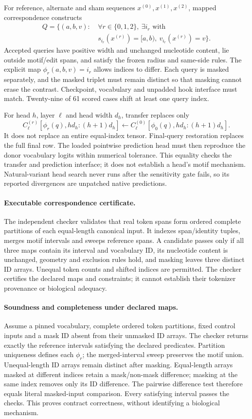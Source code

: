 \documentclass[unnumsec,webpdf,modern,large,namedate]{oup-authoring-template}
\begin{document}
For reference, alternate and sham sequences $x^{(0)},x^{(1)},x^{(2)}$, mapped correspondence constructs
\[
\begin{aligned}Q=\{(a,b,v):\ &\forall r\in\{0,1,2\},\ \exists i_r\text{ with }\\
&s_{i_r}(x^{(r)})=[a,b),\ v_{i_r}(x^{(r)})=v\}.\end{aligned}
\]
Accepted queries have positive width and unchanged nucleotide content, lie outside motif/edit spans, and satisfy the frozen radius and same-side rules. The explicit map $\phi_r(a,b,v)=i_r$ allows indices to differ. Each query is masked separately, and the masked triplet must remain distinct so that masking cannot erase the contrast. Checkpoint, vocabulary and unpadded hook interface must match. Twenty-nine of 61 scored cases shift at least one query index.

For head $h$, layer $\ell$ and head width $d_h$, transfer replaces only
\[
C^{(r)}_{\ell}[\phi_r(q),hd_h:(h+1)d_h]
\leftarrow C^{(0)}_{\ell}[\phi_0(q),hd_h:(h+1)d_h].
\]
It does not replace an entire equal-index tensor. Final-query restoration replaces the full final row. The loaded pointwise prediction head must then reproduce the donor vocabulary logits within numerical tolerance. This equality checks the transfer and prediction interface; it does not establish a head's motif mechanism. Natural-variant head search never runs after the sensitivity gate fails, so its reported divergences are unpatched native predictions.

\paragraph{Executable correspondence certificate.}
The independent checker validates that real token spans form ordered complete partitions of each equal-length canonical input. It indexes span/identity tuples, merges motif intervals and sweeps reference spans. A candidate passes only if all three maps contain its interval and vocabulary ID, its nucleotide content is unchanged, geometry and exclusion rules hold, and masking leaves three distinct ID arrays. Unequal token counts and shifted indices are permitted. The checker certifies the declared maps and constraints; it cannot establish their tokenizer provenance or biological adequacy.

\paragraph{Soundness and completeness under declared maps.}
Assume a pinned vocabulary, complete ordered token partitions, fixed control inputs and a mask ID absent from their unmasked ID arrays. The checker returns exactly the reference intervals satisfying the declared predicates. Partition uniqueness defines each $\phi_r$; the merged-interval sweep preserves the motif union. Unequal-length ID arrays remain distinct after masking. Equal-length arrays masked at different indices retain a mask/non-mask difference; masking at the same index removes only its ID difference. The pairwise difference test therefore equals literal masked-input comparison. Every satisfying interval passes the checks. This proves contract correctness, without identifying a biological mechanism.
\end{document}
